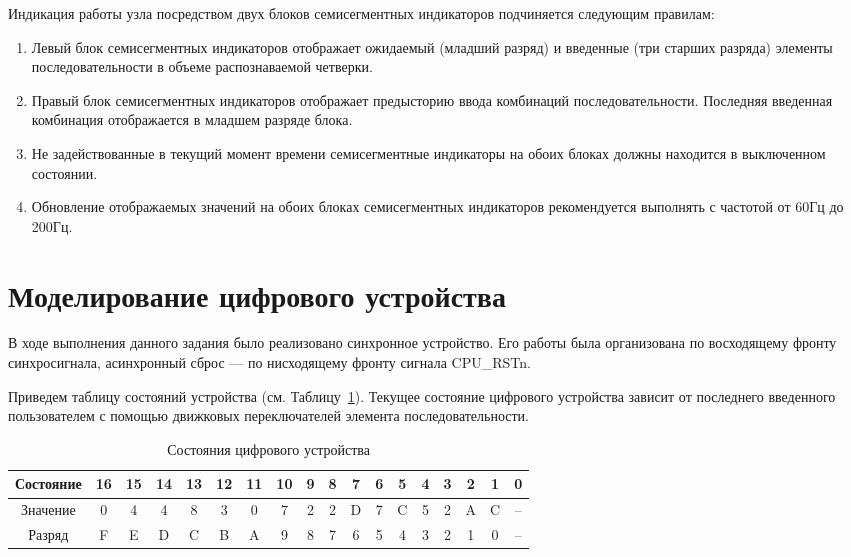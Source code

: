 Индикация работы узла посредством двух блоков семисегментных индикаторов подчиняется следующим правилам:
\begin{enumerate}
	\item Левый блок семисегментных индикаторов отображает ожидаемый (младший
	разряд) и введенные (три старших разряда) элементы последовательности в объеме
	распознаваемой четверки.
	\item  Правый блок семисегментных индикаторов отображает предысторию ввода
	комбинаций последовательности. Последняя введенная комбинация отображается в
	младшем разряде блока.
	\item  Не задействованные в текущий момент времени семисегментные индикаторы на
	обоих блоках должны находится в выключенном состоянии.
	\item Обновление отображаемых значений на обоих блоках семисегментных
	индикаторов рекомендуется выполнять с частотой от 60Гц до 200Гц.
\end{enumerate}


\section{Моделирование цифрового устройства}

В ходе выполнения данного задания было реализовано синхронное устройство. Его работы была организована по восходящему фронту синхросигнала, асинхронный сброс --- по нисходящему фронту сигнала CPU\_RSTn. 

Приведем таблицу состояний устройства (см. Таблицу~\ref{tab:states}). Текущее состояние цифрового устройства зависит от последнего введенного пользователем с помощью движковых переключателей элемента последовательности. 

\begin{table}[h!]
	\centering
	\small
	\caption{Состояния цифрового устройства}
	\begin{tabular}{|c|c|c|c|c|c|c|c|c|c|c|c|c|c|c|c|c|c|}
		\hline
		Состояние & 16& 15&	14	&13	&12&11&	10&	9&	8&	7&	6&	5&	4&	3&	2&	1&	0\\ \hline\hline
		Значение & 0 & 4 & 4 & 8 & 3 & 0 & 7 & 2 & 2 & D & 7 & C & 5 & 2 & A & C&-- \\ \hline\hline
		Разряд & F & E & D & C & B & A & 9 & 8 & 7 & 6 & 5 & 4 & 3 & 2 & 1 & 0 &--\\ \hline
	\end{tabular}
	
	\label{tab:states}
\end{table}

